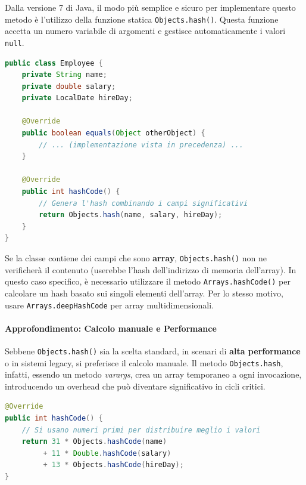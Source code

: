 Dalla versione 7 di Java, il modo più semplice e sicuro per implementare questo metodo è l'utilizzo della funzione statica \texttt{Objects.hash()}. Questa funzione accetta un numero variabile di argomenti e gestisce automaticamente i valori \texttt{null}.

\begin{lstlisting}[language=Java, caption={Esempio di implementazione coordinata in Employee}]
public class Employee {
    private String name;
    private double salary;
    private LocalDate hireDay;

    @Override
    public boolean equals(Object otherObject) {
        // ... (implementazione vista in precedenza) ...
    }

    @Override
    public int hashCode() {
        // Genera l'hash combinando i campi significativi
        return Objects.hash(name, salary, hireDay);
    }
}
\end{lstlisting}

\begin{warningbox}
    Se la classe contiene dei campi che sono \textbf{array}, \texttt{Objects.hash()} non ne verificherà il contenuto (userebbe l'hash dell'indirizzo di memoria dell'array). In questo caso specifico, è necessario utilizzare il metodo \texttt{Arrays.hashCode()} per calcolare un hash basato sui singoli elementi dell'array. Per lo stesso motivo, usare \texttt{Arrays.deepHashCode} per array multidimensionali.
\end{warningbox}

\paragraph{Approfondimento: Calcolo manuale e Performance}

Sebbene \texttt{Objects.hash()} sia la scelta standard, in scenari di \textbf{alta performance} o in sistemi legacy, si preferisce il calcolo manuale. Il metodo \texttt{Objects.hash}, infatti, essendo un metodo \textit{varargs}, crea un array temporaneo a ogni invocazione, introducendo un overhead che può diventare significativo in cicli critici.

\begin{lstlisting}[language=Java, caption={Calcolo manuale ottimizzato}]
@Override
public int hashCode() {
    // Si usano numeri primi per distribuire meglio i valori
    return 31 * Objects.hashCode(name) 
         + 11 * Double.hashCode(salary) 
         + 13 * Objects.hashCode(hireDay);
}
\end{lstlisting}

